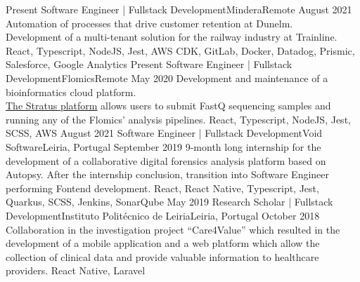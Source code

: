 %
%
%
\begin{experiences}
  \experience
    {Present}   {Software Engineer | Fullstack Development}{Mindera}{Remote}
    {August 2021} {Automation of processes that drive customer retention at Dunelm.\\
                  Development of a multi-tenant solution for the railway industry at Trainline.}
                  {React, Typescript, NodeJS, Jest, AWS CDK, GitLab, Docker, Datadog, Prismic, Salesforce, Google Analytics}
  \emptySeparator
  \experience
    {Present} {Software Engineer | Fullstack Development}{Flomics}{Remote}
    {May 2020}    {Development and maintenance of a bioinformatics cloud platform.\\
                  \href{https://cloud.flomics.com}{The Stratus platform} allows users to submit FastQ sequencing samples and running any of the Flomics' analysis pipelines.}
                  {React, Typescript, NodeJS, Jest, SCSS, AWS}
  \emptySeparator
  \experience
    {August 2021}     {Software Engineer | Fullstack Development}{Void Software}{Leiria, Portugal}
    {September 2019}    {9-month long internship for the development of a collaborative digital forensics analysis
                          platform based on Autopsy.
                          After the internship conclusion, transition into Software Engineer
                          performing Fontend development.}
                  {React, React Native, Typescript, Jest, Quarkus, SCSS, Jenkins, SonarQube}
  \emptySeparator
  \emptySeparator
  \experience
    {May 2019}     {Research Scholar | Fullstack Development}{Instituto Politécnico de Leiria}{Leiria, Portugal}
    {October 2018}    {Collaboration in the investigation project “Care4Value” which resulted in
                        the development of a mobile application and a web platform which allow
                        the collection of clinical data and provide valuable information to
                        healthcare providers.}
                    {React Native, Laravel}
  \emptySeparator
\end{experiences}
